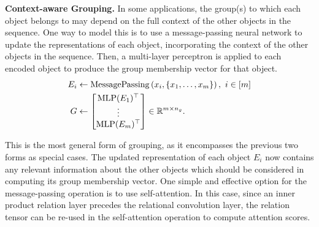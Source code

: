\textbf{Context-aware Grouping.} In some applications, the group(s) to which each object belongs to may depend on the full context of the other objects in the sequence. One way to model this is to use a message-passing neural network to update the representations of each object, incorporating the context of the other objects in the sequence. Then, a multi-layer perceptron is applied to each encoded object to produce the group membership vector for that object.
\begin{equation}
    \begin{split}
        E_i &\gets \mathrm{MessagePassing}\paren{x_i, \set{x_1, \ldots, x_m}}, \ i \in [m] \\
        G &\gets \begin{bmatrix}\mathrm{MLP}(E_1)^\top \\ \vdots \\ \mathrm{MLP}(E_m)^\top \end{bmatrix} \in \reals^{m \times n_g}.
    \end{split}
\end{equation}

This is the most general form of grouping, as it encompasses the previous two forms as special cases. The updated representation of each object $E_i$ now contains any relevant information about the other objects which should be considered in computing its group membership vector. One simple and effective option for the message-passing operation is to use self-attention. In this case, since an inner product relation layer precedes the relational convolution layer, the relation tensor can be re-used in the self-attention operation to compute attention scores.
